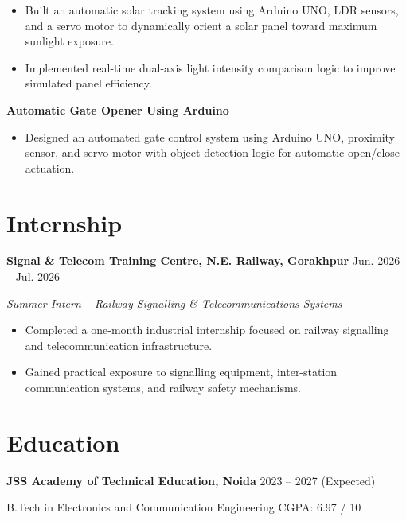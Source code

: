 \documentclass[a4paper,10pt]{article}
\begin{document}
\begin{itemize}
    \item Built an automatic solar tracking system using Arduino UNO, LDR sensors, and a servo motor to dynamically orient a solar panel toward maximum sunlight exposure.
    \item Implemented real-time dual-axis light intensity comparison logic to improve simulated panel efficiency.
\end{itemize}

\vspace{2pt}

\textbf{Automatic Gate Opener Using Arduino}

\begin{itemize}
    \item Designed an automated gate control system using Arduino UNO, proximity sensor, and servo motor with object detection logic for automatic open/close actuation.
\end{itemize}

\section{Internship}

\textbf{Signal \& Telecom Training Centre, N.E. Railway, Gorakhpur}
\hfill Jun. 2026 -- Jul. 2026

\textit{Summer Intern -- Railway Signalling \& Telecommunications Systems}

\begin{itemize}
    \item Completed a one-month industrial internship focused on railway signalling and telecommunication infrastructure.
    \item Gained practical exposure to signalling equipment, inter-station communication systems, and railway safety mechanisms.
\end{itemize}

\section{Education}

\textbf{JSS Academy of Technical Education, Noida} \hfill 2023 -- 2027 (Expected)

B.Tech in Electronics and Communication Engineering \hfill CGPA: 6.97 / 10

\vspace{3pt}
\end{document}
